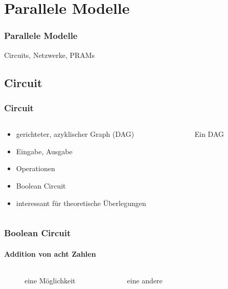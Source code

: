 \section{Parallele Modelle}

\begin{frame}
    \frametitle{Parallele Modelle}
    Circuits, Netzwerke, PRAMs
\end{frame}


\subsection{Circuit}
\begin{frame}
    \frametitle{Circuit}
    \begin{columns}
        \begin{column}{0.5\textwidth}
            \begin{itemize}
                \item gerichteter, azyklischer Graph (DAG)
                \item Eingabe, Ausgabe
                \item Operationen
                \item Boolean Circuit
                \item interessant für theoretische Überlegungen
            \end{itemize}
        \end{column}
        \begin{column}{0.5\textwidth}
            \begin{figure}
                \centering
                
                \caption{Ein DAG}
                \label{fig:dag}
            \end{figure}
        \end{column}
    \end{columns}
\end{frame}

\begin{frame}[b]
    \frametitle{Boolean Circuit}
    \framesubtitle{Addition von acht Zahlen}
    \begin{columns}[b]
        \begin{figure}
            \centering
            
            \caption{eine Möglichkeit}
        \end{figure}
        \pause
        \begin{figure}
            \centering
            
            \caption{eine andere}
        \end{figure}
    \end{columns}
\end{frame}

